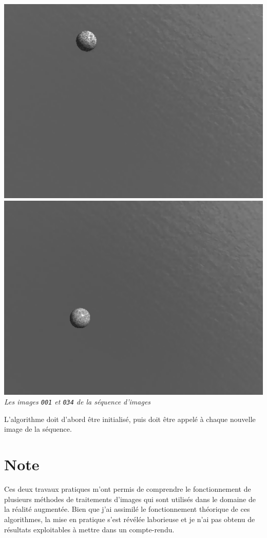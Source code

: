 \documentclass[a4paper,12pt]{article}
\begin{document}
\begin{center}
\includegraphics[scale=0.3]{Image000.png}\hspace{0.2cm}
\includegraphics[scale=0.3]{Image034.png}\\
\textit{Les images \texttt{001} et \texttt{034} de la séquence d'images}
\end{center}

L'algorithme doit d'abord être initialisé, puis doit être appelé à chaque nouvelle image de la séquence.

\vspace{2cm}
\section*{Note}
Ces deux travaux pratiques m'ont permis de comprendre le fonctionnement de plusieurs méthodes de traitements d'images qui sont utilisés dans le domaine de la réalité augmentée. Bien que j'ai assimilé le fonctionnement théorique de ces algorithmes, la mise en pratique s'est révélée laborieuse et je n'ai pas obtenu de résultats exploitables à mettre dans un compte-rendu.
\end{document}
